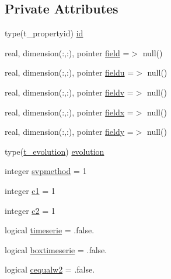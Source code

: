 \subsection*{Private Attributes}
\begin{DoxyCompactItemize}
\item 
type(t\+\_\+propertyid) \mbox{\hyperlink{structmoduleinterfacewaterair_1_1t__property_aa486bebc9ada428c7ef302294d94040d}{id}}
\item 
real, dimension(\+:,\+:), pointer \mbox{\hyperlink{structmoduleinterfacewaterair_1_1t__property_ac6c49c2c1e826623d106086aa9222271}{field}} =$>$ null()
\item 
real, dimension(\+:,\+:), pointer \mbox{\hyperlink{structmoduleinterfacewaterair_1_1t__property_a720b9637508fe9391c7d07acd14b7d63}{fieldu}} =$>$ null()
\item 
real, dimension(\+:,\+:), pointer \mbox{\hyperlink{structmoduleinterfacewaterair_1_1t__property_abed134595c36546f7ef0069a36331977}{fieldv}} =$>$ null()
\item 
real, dimension(\+:,\+:), pointer \mbox{\hyperlink{structmoduleinterfacewaterair_1_1t__property_a6700d17fc4944fec3bb39c76c44309a8}{fieldx}} =$>$ null()
\item 
real, dimension(\+:,\+:), pointer \mbox{\hyperlink{structmoduleinterfacewaterair_1_1t__property_a0563692672055713067c127ebbba368e}{fieldy}} =$>$ null()
\item 
type(\mbox{\hyperlink{structmoduleinterfacewaterair_1_1t__evolution}{t\+\_\+evolution}}) \mbox{\hyperlink{structmoduleinterfacewaterair_1_1t__property_a1ca0f6ad15b7f3a18d5396b9160deef7}{evolution}}
\item 
integer \mbox{\hyperlink{structmoduleinterfacewaterair_1_1t__property_a638955a9cf2d3d64f2691c69e2cd5fd8}{svpmethod}} = 1
\item 
integer \mbox{\hyperlink{structmoduleinterfacewaterair_1_1t__property_a83db6d199f2bd535efd4e85a6af78745}{c1}} = 1
\item 
integer \mbox{\hyperlink{structmoduleinterfacewaterair_1_1t__property_a1382a31c66026343d02d78763f712e6b}{c2}} = 1
\item 
logical \mbox{\hyperlink{structmoduleinterfacewaterair_1_1t__property_a4349f26e194ba75aebe0557b0666a706}{timeserie}} = .false.
\item 
logical \mbox{\hyperlink{structmoduleinterfacewaterair_1_1t__property_a810f4d23e214a6a245aee600558162da}{boxtimeserie}} = .false.
\item 
logical \mbox{\hyperlink{structmoduleinterfacewaterair_1_1t__property_a399702584c0125473c3e3be8805305fe}{cequalw2}} = .false.

\end{DoxyCompactItemize}
